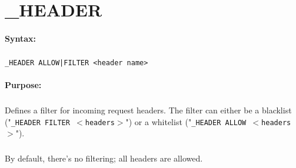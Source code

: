 
\newpage
\section{\_HEADER}
\label{cmd:_HEADER}

\paragraph{Syntax:}
\subparagraph{}
\texttt{\_HEADER ALLOW|FILTER <header name>}

\paragraph{Purpose:}
\subparagraph{}
Defines a filter for incoming request headers. The filter can
either be a blacklist ("\texttt{\_HEADER FILTER $<$headers$>$}") 
or a whitelist ("\texttt{\_HEADER ALLOW $<$headers$>$}").

\subparagraph{}
By default, there's no filtering; all headers are allowed.
